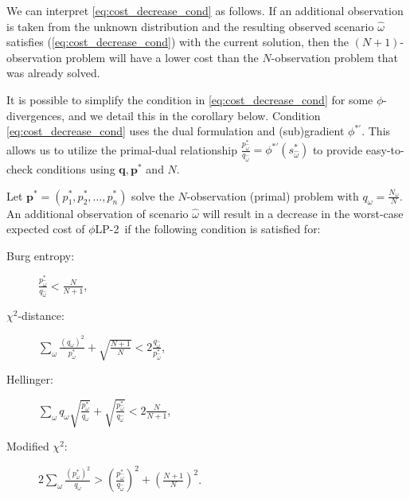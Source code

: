 \documentclass[opre,nonblindrev]{informs3} %
\newcommand{\q}{\mathbf{q}}
\newcommand{\p}{\mathbf{p}}
\newcommand{\plp}{$\phi$LP-2}
\begin{document}
We can interpret \eqref{eq:cost_decrease_cond} as follows. 
If an additional observation is taken from the unknown distribution and the resulting observed scenario $\hat{\omega}$ satisfies (\ref{eq:cost_decrease_cond}) with the current solution, then the $(N+1)$-observation problem will have a lower cost than the $N$-observation problem that was already solved.


It is possible to simplify the condition in \eqref{eq:cost_decrease_cond} for some $\phi$-divergences, and we detail this in the corollary below. 
Condition \eqref{eq:cost_decrease_cond} uses the dual formulation and (sub)gradient $\phi^{* \prime}$. 
This allows us to utilize the primal-dual relationship $\frac{p_{\hat{\omega}}^*}{q_{\hat{\omega}}} = \phi^{* \prime}(s_{\hat{\omega}}^*)$ to provide easy-to-check conditions using $\q,\p^*$ and $N$. 


\begin{corollary}
	\label{cor:cost_decrease_trick}
	Let $\p^*=(p_1^*, p_2^*,\ldots, p_n^*)$ solve the $N$-observation (primal) problem with $q_\omega = \tfrac{N_\omega}{N}$.
	An additional observation of scenario $\hat{\omega}$ will result in a decrease in the worst-case expected cost of \plp\ if the following condition is satisfied for:\vspace*{-0.1in}
	\begin{multicols}{2}
		\begin{description}
			\item[Burg entropy:] $\frac{p_{\hat{\omega}}^*}{q_{\hat{\omega}}} < \frac{N}{N+1}$, %
			\item[$\chi^2$-distance:]  $\sum_\omega \frac{(q_\omega)^2}{p_\omega^*} + \sqrt{\frac{N+1}{N}} < 2 \frac{q_{\hat{\omega}}}{p_{\hat{\omega}}^*}$,
			\item[Hellinger:] $\sum_\omega q_\omega \sqrt{\frac{p_\omega^*}{q_\omega}} + \sqrt{\frac{p_{\hat{\omega}}^*}{q_{\hat{\omega}}}} < 2 \frac{N}{N+1}$,
			\item[Modified $\chi^2$:] $2 \sum_\omega \frac{(p_\omega^*)^2}{q_\omega} > \left(\frac{p_{\hat{\omega}}^*}{q_{\hat{\omega}}}\right)^2 + \left(\frac{N+1}{N}\right)^2$.
		\end{description}
	\end{multicols}
\end{corollary}
\end{document}
